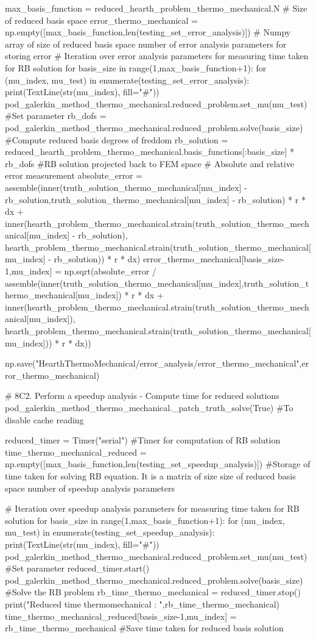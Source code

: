 \begin{python}
max_basis_function = reduced_hearth_problem_thermo_mechanical.N # Size of reduced basis space
error_thermo_mechanical = np.empty([max_basis_function,len(testing_set_error_analysis)]) # Numpy array of size of reduced basis space \times number of error analysis parameters for storing error
# Iteration over error analysis parameters for measuring time taken for RB solution
for basis_size in range(1,max_basis_function+1):
	for (mu_index, mu_test) in enumerate(testing_set_error_analysis):
		print(TextLine(str(mu_index), fill="#"))
		pod_galerkin_method_thermo_mechanical.reduced_problem.set_mu(mu_test) #Set parameter
		rb_dofs = pod_galerkin_method_thermo_mechanical.reduced_problem.solve(basis_size) #Compute reduced basis degrees of freddom
		rb_solution = reduced_hearth_problem_thermo_mechanical.basis_functions[:basis_size] * rb_dofs #RB solution projected back to FEM space
		# Absolute and relative error measurement
		absolute_error = assemble(inner(truth_solution_thermo_mechanical[mu_index] - rb_solution,truth_solution_thermo_mechanical[mu_index] - rb_solution) * r * dx + inner(hearth_problem_thermo_mechanical.strain(truth_solution_thermo_mechanical[mu_index] - rb_solution), hearth_problem_thermo_mechanical.strain(truth_solution_thermo_mechanical[mu_index] - rb_solution)) * r * dx)
		error_thermo_mechanical[basis_size-1,mu_index] = np.sqrt(absolute_error / assemble(inner(truth_solution_thermo_mechanical[mu_index],truth_solution_thermo_mechanical[mu_index]) * r * dx + inner(hearth_problem_thermo_mechanical.strain(truth_solution_thermo_mechanical[mu_index]), hearth_problem_thermo_mechanical.strain(truth_solution_thermo_mechanical[mu_index])) * r * dx))

np.save("HearthThermoMechanical/error_analysis/error_thermo_mechanical",error_thermo_mechanical)

# 8C2. Perform a speedup analysis - Compute time for reduced solutions
pod_galerkin_method_thermo_mechanical._patch_truth_solve(True) #To disable cache reading

reduced_timer = Timer("serial") #Timer for computation of RB solution
time_thermo_mechanical_reduced = np.empty([max_basis_function,len(testing_set_speedup_analysis)]) #Storage of time taken for solving RB equation. It is a matrix of size size of reduced basis space \times number of speedup analysis parameters

# Iteration over speedup analysis parameters for measuring time taken for RB solution
for basis_size in range(1,max_basis_function+1):
	for (mu_index, mu_test) in enumerate(testing_set_speedup_analysis):
		print(TextLine(str(mu_index), fill="#"))
		pod_galerkin_method_thermo_mechanical.reduced_problem.set_mu(mu_test) #Set parameter
		reduced_timer.start()
		pod_galerkin_method_thermo_mechanical.reduced_problem.solve(basis_size) #Solve the RB problem
		rb_time_thermo_mechanical = reduced_timer.stop()
		print("Reduced time thermomechanical : ",rb_time_thermo_mechanical)
		time_thermo_mechanical_reduced[basis_size-1,mu_index] = rb_time_thermo_mechanical #Save time taken for reduced basis solution


\end{python}

